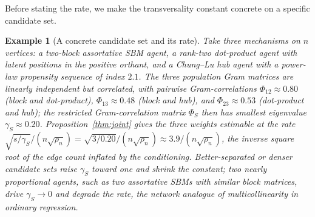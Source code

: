 \documentclass[12pt]{article}
\newtheorem{example}{Example}
\newcommand{\1}{\mathbf{1}}
\begin{document}
Before stating the rate, we make the transversality constant concrete on a specific candidate set.

\begin{example}[A concrete candidate set and its rate]\label{ex:gammaS}
Take three mechanisms on $n$ vertices: a two-block assortative SBM agent, a rank-two dot-product
agent with latent positions in the positive orthant, and a Chung--Lu hub agent with a power-law
propensity sequence of index $2.1$. The three population Gram matrices are linearly independent but
correlated, with pairwise Gram-correlations $\Phi_{12}\approx0.80$ (block and dot-product),
$\Phi_{13}\approx0.48$ (block and hub), and $\Phi_{23}\approx0.53$ (dot-product and hub); the
restricted Gram-correlation matrix $\Phi_S$ then has smallest eigenvalue $\gamma_S\approx0.20$.
Proposition~\ref{thm:joint} gives the three weights estimable at the rate
$\sqrt{s/\gamma_S}/(n\sqrt{\rho_n})=\sqrt{3/0.20}/(n\sqrt{\rho_n})\approx3.9/(n\sqrt{\rho_n})$, the
inverse square root of the edge count inflated by the conditioning. Better-separated or denser
candidate sets raise $\gamma_S$ toward one and shrink the constant; two nearly proportional agents,
such as two assortative SBMs with similar block matrices, drive $\gamma_S\to0$ and degrade the rate,
the network analogue of multicollinearity in ordinary regression.
\end{example}
\end{document}
